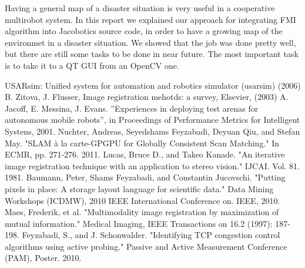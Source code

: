 \documentclass{article}
\begin{document}
Having a general map of a disaster situation is very useful in a cooperative multirobot system. In this report we explained our approach for integrating FMI algorithm into Jacobotics source code, in order to have a growing map of the environmet in a disaster situation. We showed that the job was done pretty well, but there are still some tasks to be done in near future. The most important task is to take it to a QT GUI from an OpenCV one.\\


\begin{thebibliography}{1}
 USARsim: Unified system for automation and robotics simulator (usarsim) (2006)
 B. Zitova, J. Flusser, Image registration mehotds: a survey, Elsevier, (2003)
 A. Jacoff, E. Messina, J. Evans. ”Experiences in deploying test arenas for autonomous mobile robots”, in Proceedings of Performance Metrics for Intelligent Systens, 2001.
Nuchter, Andreas, Seyedshams Feyzabadi, Deyuan Qiu, and Stefan May. "SLAM à la carte-GPGPU for Globally Consistent Scan Matching." In ECMR, pp. 271-276. 2011.
Lucas, Bruce D., and Takeo Kanade. "An iterative image registration technique with an application to stereo vision." IJCAI. Vol. 81. 1981.
Baumann, Peter, Shams Feyzabadi, and Constantin Jucovschi. "Putting pixels in place: A storage layout language for scientific data." Data Mining Workshops (ICDMW), 2010 IEEE International Conference on. IEEE, 2010.
Maes, Frederik, et al. "Multimodality image registration by maximization of mutual information." Medical Imaging, IEEE Transactions on 16.2 (1997): 187-198.
Feyzabadi, S., and J. Schonwalder. "Identifying TCP congestion control algorithms using active probing." Passive and Active Measurement Conference (PAM), Poster. 2010.


\end{thebibliography}
\end{document}
